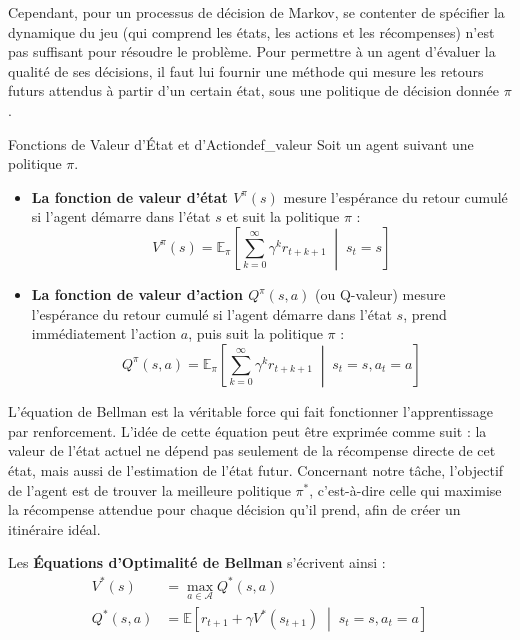 \documentclass[12pt, a4paper, twoside, openright]{book}
\newcommand{\E}{\mathbb{E}}
\begin{document}
Cependant, pour un processus de décision de Markov, se contenter de spécifier la dynamique du jeu (qui comprend les états, les actions et les récompenses) n'est pas suffisant pour résoudre le problème. Pour permettre à un agent d'évaluer la qualité de ses décisions, il faut lui fournir une méthode qui mesure les \og retours futurs attendus \fg{} à partir d'un certain état, sous une politique de décision donnée $\pi$.
	\begin{definition}{Fonctions de Valeur d'État et d'Action}{def_valeur}
		Soit un agent suivant une politique $\pi$. 
		\begin{itemize}
			\item \textbf{La fonction de valeur d'état $V^\pi(s)$} mesure l'espérance du retour cumulé si l'agent démarre dans l'état $s$ et suit la politique $\pi$ :
			\begin{equation}
				V^\pi(s) = \E_\pi \left[ \sum_{k=0}^{\infty} \gamma^k r_{t+k+1} \;\middle|\; s_t = s \right]
			\end{equation}
			\item \textbf{La fonction de valeur d'action $Q^\pi(s, a)$} (ou Q-valeur) mesure l'espérance du retour cumulé si l'agent démarre dans l'état $s$, prend immédiatement l'action $a$, puis suit la politique $\pi$ :
			\begin{equation}
				Q^\pi(s, a) = \E_\pi \left[ \sum_{k=0}^{\infty} \gamma^k r_{t+k+1} \;\middle|\; s_t = s, a_t = a \right]
			\end{equation}
		\end{itemize}
	\end{definition}
	
L'équation de Bellman est la véritable force qui fait fonctionner l'apprentissage par renforcement. L'idée de cette équation peut être exprimée comme suit : la valeur de l'état actuel ne dépend pas seulement de la récompense directe de cet état, mais aussi de l'estimation de l'état futur. Concernant notre tâche, l'objectif de l'agent est de trouver la meilleure politique $\pi^*$, c'est-à-dire celle qui maximise la récompense attendue pour chaque décision qu'il prend, afin de créer un itinéraire idéal.
	
	Les \textbf{Équations d'Optimalité de Bellman} s'écrivent ainsi :
	\begin{align}
		V^*(s) &= \max_{a \in \mathcal{A}} Q^*(s, a) \label{eq:bellman_v} \\
		Q^*(s, a) &= \E \left[ r_{t+1} + \gamma V^*(s_{t+1}) \;\middle|\; s_t = s, a_t = a \right] \label{eq:bellman_q}
	\end{align}
	
\end{document}
